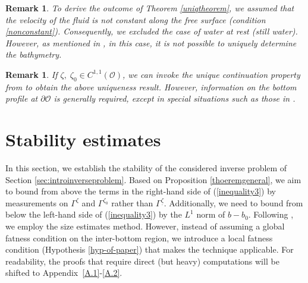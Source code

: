 \documentclass[11pt]{article}
\newtheorem{remark}[theorem]{Remark}
\begin{document}
\begin{remark}
 To derive the outcome of Theorem \ref{uniqtheorem}, we assumed that the velocity of the fluid is not constant along the free surface (condition \eqref{nonconstant}). Consequently, we excluded the case of water at rest (still water). However, as mentioned in \cite[Remark 2.12]{fontelos2017bottom}, in this case, it is not possible to uniquely determine the bathymetry.
\end{remark}

\begin{remark}
    If $\zeta,\;\zeta_0 \in C^{1,1}(\mathcal O)$, we can invoke the unique continuation property from \cite{bourgeois2010about} to obtain the above uniqueness result. However, information on the bottom profile at $\partial \mathcal{O} $ is generally required, except in special situations such as those in \cite{fontelos2017bottom,lecaros2020stability}.
\end{remark}


\section{Stability estimates}\label{sec:stability}
In this section, we establish the stability of the considered inverse problem of Section \ref{sec:introinverseproblem}. Based on Proposition \ref{thoeremgeneral}, we aim to bound from above the terms in the right-hand side of (\ref{inequality3}) by measurements on $\Gamma^{\zeta}$ and $\Gamma^{\zeta_0}$ rather than $\Gamma^{\underline{\zeta}}$. Additionally, we need to bound from below the left-hand side of (\ref{inequality3}) by the $L^1$ norm of $b-b_0$.
Following \cite{lecaros2020stability}, we employ the size estimates method. However, instead of assuming a global fatness condition on the inter-bottom region, we introduce a local fatness condition (Hypothesis \ref{hyp-of-paper}) that makes the technique applicable. For readability, the proofs that require direct (but heavy) computations will be shifted to Appendix~\ref{A.1}-\ref{A.2}. 
\end{document}
